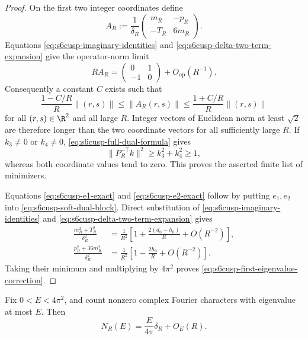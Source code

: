 \begin{proof}
On the first two integer coordinates define
\begin{equation}\label{eq:s6cusp-dual-two-matrix}
 A_R:=\frac1{\delta_R}
 \begin{pmatrix}m_R&-p_R\\-T_R&6m_R\end{pmatrix}.
\end{equation}
Equations \eqref{eq:s6cusp-imaginary-identities} and
\eqref{eq:s6cusp-delta-two-term-expansion} give the operator-norm limit
\begin{equation}\label{eq:s6cusp-scaled-dual-limit}
 RA_R=
 \begin{pmatrix}0&1\\-1&0\end{pmatrix}+O_{\mathrm{op}}(R^{-1}).
\end{equation}
Consequently a constant \(C\) exists such that
\[
 \frac{1-C/R}{R}\lVert(r,s)\rVert
 \le\lVert A_R(r,s)\rVert
 \le\frac{1+C/R}{R}\lVert(r,s)\rVert
\]
for all \((r,s)\in\R^2\) and all large \(R\).  Integer vectors of
Euclidean norm at least \(\sqrt2\) are therefore longer than the two
coordinate vectors for all sufficiently large \(R\).  If \(k_3\ne0\) or
\(k_4\ne0\), \eqref{eq:s6cusp-full-dual-formula} gives
\[
 \lVert P_R^{-\mathsf T}k\rVert^2\ge k_3^2+k_4^2\ge1,
\]
whereas both coordinate values tend to zero.  This proves the asserted
finite list of minimizers.

Equations \eqref{eq:s6cusp-e1-exact} and
\eqref{eq:s6cusp-e2-exact} follow by putting \(e_1,e_2\) into
\eqref{eq:s6cusp-soft-dual-block}.  Direct substitution of
\eqref{eq:s6cusp-imaginary-identities} and
\eqref{eq:s6cusp-delta-two-term-expansion} gives
\begin{align*}
 \frac{m_R^2+T_R^2}{\delta_R^2}
 &=\frac1{R^2}\left[1+\frac{2(d_0-h_0)}R+O(R^{-2})\right],\\
 \frac{p_R^2+36m_R^2}{\delta_R^2}
 &=\frac1{R^2}\left[1-\frac{2h_0}R+O(R^{-2})\right].
\end{align*}
Taking their minimum and multiplying by \(4\pi^2\) proves
\eqref{eq:s6cusp-first-eigenvalue-correction}.
\end{proof}

\begin{proposition}
\label{prop:s6cusp-low-energy-count}
Fix \(0<E<4\pi^2\), and count nonzero complex Fourier characters with
eigenvalue at most \(E\).  Then
\begin{equation}\label{eq:s6cusp-low-energy-count}
 N_R(E)=\frac{E}{4\pi}\delta_R+O_E(R).
\end{equation}
\end{proposition}

